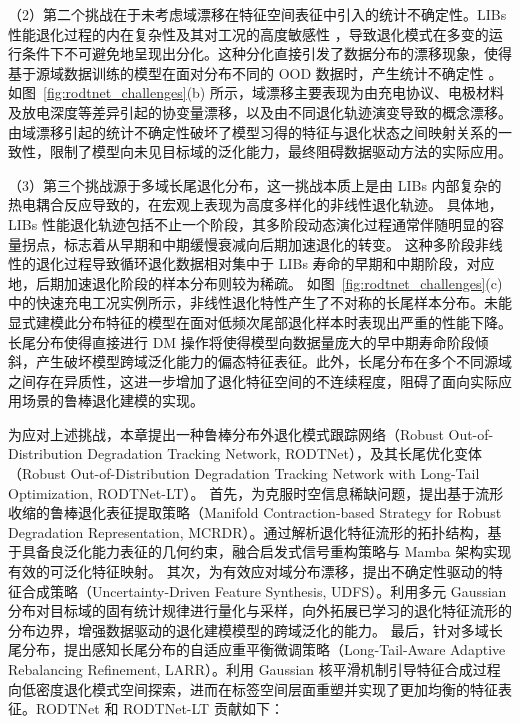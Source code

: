 （2）第二个挑战在于未考虑域漂移在特征空间表征中引入的统计不确定性。LIBs 性能退化过程的内在复杂性及其对工况的高度敏感性 \cite{LI2024155588}，导致退化模式在多变的运行条件下不可避免地呈现出分化。这种分化直接引发了数据分布的漂移现象，使得基于源域数据训练的模型在面对分布不同的 OOD 数据时，产生统计不确定性 \cite{9577663, pmlr-v202-dai23d, liuncertainty}。如图~\ref{fig:rodtnet_challenges}(b) 所示，域漂移主要表现为由充电协议、电极材料及放电深度等差异引起的协变量漂移，以及由不同退化轨迹演变导致的概念漂移。由域漂移引起的统计不确定性破坏了模型习得的特征与退化状态之间映射关系的一致性，限制了模型向未见目标域的泛化能力，最终阻碍数据驱动方法的实际应用。

（3）第三个挑战源于多域长尾退化分布，这一挑战本质上是由 LIBs 内部复杂的热电耦合反应导致的，在宏观上表现为高度多样化的非线性退化轨迹。
具体地，LIBs 性能退化轨迹包括不止一个阶段，其多阶段动态演化过程通常伴随明显的容量拐点，标志着从早期和中期缓慢衰减向后期加速退化的转变。
这种多阶段非线性的退化过程导致循环退化数据相对集中于 LIBs 寿命的早期和中期阶段，对应地，后期加速退化阶段的样本分布则较为稀疏。
如图~\ref{fig:rodtnet_challenges}(c) 中的快速充电工况实例所示，非线性退化特性产生了不对称的长尾样本分布。未能显式建模此分布特征的模型在面对低频次尾部退化样本时表现出严重的性能下降。
长尾分布使得直接进行 DM 操作将使得模型向数据量庞大的早中期寿命阶段倾斜，产生破坏模型跨域泛化能力的偏态特征表征。此外，长尾分布在多个不同源域之间存在异质性，这进一步增加了退化特征空间的不连续程度，阻碍了面向实际应用场景的鲁棒退化建模的实现。

\sloppy
为应对上述挑战，本章提出一种鲁棒分布外退化模式跟踪网络（Robust Out-of-Distribution Degradation  Tracking Network, RODTNet），及其长尾优化变体（Robust Out-of-Distribution Degradation Tracking Network with Long-Tail Optimization, RODTNet-LT）。
% 
首先，为克服时空信息稀缺问题，提出基于流形收缩的鲁棒退化表征提取策略（Manifold Contraction-based Strategy for Robust Degradation Representation, MCRDR）。通过解析退化特征流形的拓扑结构，基于具备良泛化能力表征的几何约束，融合启发式信号重构策略与 Mamba 架构实现有效的可泛化特征映射。
% 
其次，为有效应对域分布漂移，提出不确定性驱动的特征合成策略（Uncertainty-Driven Feature Synthesis, UDFS）。利用多元 Gaussian 分布对目标域的固有统计规律进行量化与采样，向外拓展已学习的退化特征流形的分布边界，增强数据驱动的退化建模模型的跨域泛化的能力。
% 
最后，针对多域长尾分布，提出感知长尾分布的自适应重平衡微调策略（Long-Tail-Aware Adaptive Rebalancing Refinement, LARR）。利用 Gaussian 核平滑机制引导特征合成过程向低密度退化模式空间探索，进而在标签空间层面重塑并实现了更加均衡的特征表征。RODTNet 和 RODTNet-LT 贡献如下：

